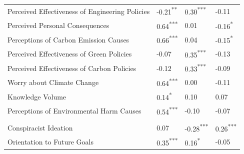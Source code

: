 \documentclass[
  letterpaper,
  DIV=11,
  numbers=noendperiod]{scrartcl}
\begin{document}
\begin{table}
\begin{tabular}[t]{l>{\raggedright\arraybackslash}p{6em}>{\raggedright\arraybackslash}p{6em}>{\raggedright\arraybackslash}p{6em}}
\hspace{1em}Perceived Effectiveness of Engineering Policies & \textcolor[HTML]{E0E1BA}{-0.21\textsuperscript{**}} & \textcolor[HTML]{F1CCC7}{0.30\textsuperscript{***}} & \textcolor[HTML]{EEEDCE}{-0.11}\\
\hspace{1em}Perceived Personal Consequences & \textcolor[HTML]{D46780}{0.64\textsuperscript{***}} & \textcolor[HTML]{FDFBE4}{0.01} & \textcolor[HTML]{E7E7C4}{-0.16\textsuperscript{*}}\\
\hspace{1em}Perceptions of Carbon Emission Causes & \textcolor[HTML]{D46780}{0.66\textsuperscript{***}} & \textcolor[HTML]{FBF4E0}{0.04} & \textcolor[HTML]{E8E9C6}{-0.15\textsuperscript{*}}\\
\hspace{1em}Perceived Effectiveness of Green Policies & \textcolor[HTML]{F3F2D6}{-0.07} & \textcolor[HTML]{EFC4C2}{0.35\textsuperscript{***}} & \textcolor[HTML]{EBEBCA}{-0.13}\\
\hspace{1em}Perceived Effectiveness of Carbon Policies & \textcolor[HTML]{EBEBCA}{-0.12} & \textcolor[HTML]{F0C6C3}{0.33\textsuperscript{***}} & \textcolor[HTML]{EFEFD0}{-0.09}\\
\hspace{1em}Worry about Climate Change & \textcolor[HTML]{D46780}{0.64\textsuperscript{***}} & \textcolor[HTML]{FBF9E2}{0.00} & \textcolor[HTML]{EEEDCE}{-0.11}\\
\hspace{1em}Knowledge Volume & \textcolor[HTML]{F7E4D6}{0.14\textsuperscript{*}} & \textcolor[HTML]{F9EBDA}{0.10} & \textcolor[HTML]{FAEFDD}{0.07}\\
\hspace{1em}Perceptions of Environmental Harm Causes & \textcolor[HTML]{E5A5AF}{0.54\textsuperscript{***}} & \textcolor[HTML]{EFEFD0}{-0.10} & \textcolor[HTML]{F2F1D4}{-0.07}\\
\addlinespace[0.3em]
\multicolumn{4}{l}{\textbf{Cognitive style}}\\
\hspace{1em}Conspiracist Ideation & \textcolor[HTML]{FAF1DE}{0.07} & \textcolor[HTML]{D7D9AC}{-0.28\textsuperscript{***}} & \textcolor[HTML]{F2D1CA}{0.26\textsuperscript{***}}\\
\hspace{1em}Orientation to Future Goals & \textcolor[HTML]{EFC4C2}{0.35\textsuperscript{***}} & \textcolor[HTML]{F7E3D5}{0.16\textsuperscript{*}} & \textcolor[HTML]{F4F3D8}{-0.05}\\

\end{tabular}
\end{table}
\end{document}
